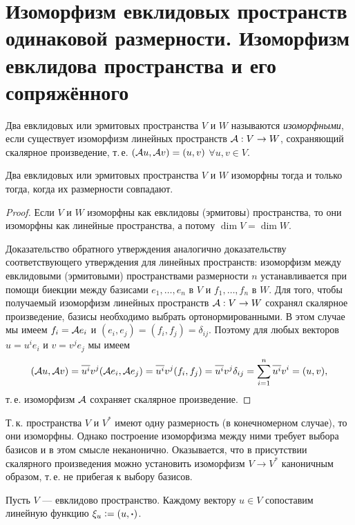 \section{Изоморфизм евклидовых пространств одинаковой размерности. Изоморфизм евклидова пространства и его сопряжённого}

\begin{definition}
    Два евклидовых или эрмитовых пространства $V$ и $W$ называются \textit{изоморфными}, если существует изоморфизм линейных пространств $\mathcal{A}: V \to W$, сохраняющий скалярное произведение, т.\,е. $(\mathcal{A} u, \mathcal{A} v) = (u, v)$ $\forall u, v \in V$.
\end{definition}

\begin{proposal}
    Два евклидовых или эрмитовых пространства $V$ и $W$ изоморфны тогда и только тогда, когда их размерности совпадают.
\end{proposal}

\begin{proof}
    Если $V$ и $W$ изоморфны как евклидовы (эрмитовы) пространства, то они изоморфны как линейные пространства, а потому $\dim V = \dim W$.
    
    Доказательство обратного утверждения аналогично доказательству соответствующего утверждения для линейных пространств: изоморфизм между евклидовыми (эрмитовыми) пространствами размерности $n$ устанавливается при помощи биекции между базисами $e_1, \ldots, e_n$ в $V$ и $f_1, \ldots, f_n$ в $W$. Для того, чтобы получаемый изоморфизм линейных пространств $\mathcal{A}: V \to W$ сохранял скалярное произведение, базисы необходимо выбрать ортонормированными. В этом случае мы имеем $f_i = \mathcal{A} e_i$ и $(e_i, e_j) = (f_i, f_j) = \delta_{ij}$. Поэтому для любых векторов $u = u^ie_i$ и $v = v^je_j$ мы имеем
    \[
        (\mathcal{A} u, \mathcal{A} v) = \overline{u^i}v^j(\mathcal{A} e_i, \mathcal{A} e_j) = \overline{u^i}v^j(f_i, f_j) = \overline{u^i}v^j\delta_{ij} = \sum_{i = 1}^n\overline{u^i}v^i = (u, v),
    \]
    т.\,е. изоморфизм $\mathcal{A}$ сохраняет скалярное произведение.
\end{proof}

Т.\,к. пространства $V$ и $V^\ast$ имеют одну размерность (в конечномерном случае), то они изоморфны. Однако построение изоморфизма между ними требует выбора базисов и в этом смысле неканонично. Оказывается, что в присутствии скалярного произведения можно установить изоморфизм $V \to V^\ast$ каноничным образом, т.\,е. не прибегая к выбору базисов.

Пусть $V$ --- евклидово пространство. Каждому вектору $u \in V$ сопоставим линейную функцию $\xi_u \vcentcolon = (u, \boldsymbol{\cdot})$.

